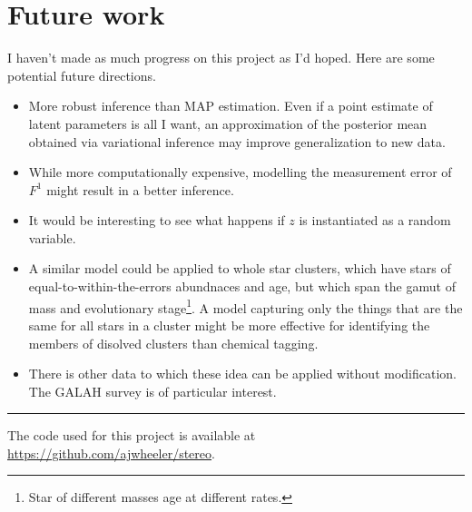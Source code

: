 \documentclass[12pt]{article}
\begin{document}
\section{Future work}
I haven't made as much progress on this project as I'd hoped.  Here are some potential future directions.
\begin{itemize}
    \item More robust inference than MAP estimation.  Even if a point estimate of latent parameters is all I want, an approximation of the posterior mean obtained via variational inference may improve generalization to new data.
    \item While more computationally expensive, modelling the measurement error of $F^1$ might result in a better inference.
    \item It would be interesting to see what happens if $z$ is instantiated as a random variable. 
    \item A similar model could be applied to whole star clusters, which have stars of equal-to-within-the-errors abundnaces and age, but which span the gamut of mass and evolutionary stage\footnote{Star of different masses age at different rates.}.
          A model capturing only the things that are the same for all stars in a cluster might be more effective for identifying the members of disolved clusters than chemical tagging.
    \item There is other data to which these idea can be applied without modification.  The GALAH survey is of particular interest.
\end{itemize}


\hrule
\vspace{0.2in}
The code used for this project is available at \url{https://github.com/ajwheeler/stereo}.
\end{document}
